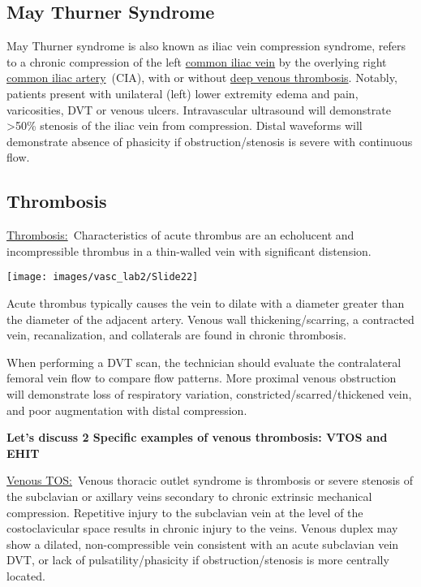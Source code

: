 \documentclass[
]{book}
\begin{document}
\hypertarget{may-thurner-syndrome}{%
\subsection{May Thurner Syndrome}\label{may-thurner-syndrome}}

May Thurner syndrome is also known as iliac vein compression syndrome,
refers to a chronic compression of the left \href{https://radiopaedia.org/articles/common-iliac-vein?lang=us}{common iliac
vein} by the
overlying right \href{https://radiopaedia.org/articles/common-iliac-artery?lang=us}{common iliac
artery}~(CIA),
with or without \href{https://radiopaedia.org/articles/deep-vein-thrombosis?lang=us}{deep venous
thrombosis}.
Notably, patients present with unilateral (left) lower extremity edema
and pain, varicosities, DVT or venous ulcers. Intravascular ultrasound
will demonstrate \textgreater50\% stenosis of the iliac vein from compression.
Distal waveforms will demonstrate absence of phasicity if
obstruction/stenosis is severe with continuous flow.

\hypertarget{thrombosis}{%
\subsection{\texorpdfstring{\textbf{Thrombosis}}{Thrombosis}}\label{thrombosis}}

\uline{Thrombosis:}~Characteristics of acute thrombus are an
echolucent and incompressible thrombus in a thin-walled vein with
significant distension.

\texttt{[image: images/vasc\_lab2/Slide22]}

Acute thrombus typically causes the vein to dilate with a diameter
greater than the diameter of the adjacent artery. Venous wall
thickening/scarring, a contracted vein, recanalization, and collaterals
are found in chronic thrombosis.

When performing a DVT scan, the technician should evaluate the
contralateral femoral vein flow to compare flow
patterns.\citep{needleman2018, societyforvascularultrasound2019} More
proximal venous obstruction will demonstrate loss of respiratory
variation, constricted/scarred/thickened vein, and poor augmentation
with distal compression.

\textbf{Let's discuss 2 Specific examples of venous thrombosis: VTOS and
EHIT}

\uline{Venous TOS:}~Venous thoracic outlet syndrome is thrombosis
or severe stenosis of the subclavian or axillary veins secondary to
chronic extrinsic mechanical compression. Repetitive injury to the
subclavian vein at the level of the costoclavicular space results in
chronic injury to the veins. Venous duplex may show a dilated,
non-compressible vein consistent with an acute subclavian vein DVT, or
lack of pulsatility/phasicity if obstruction/stenosis is more centrally
located.
\end{document}
